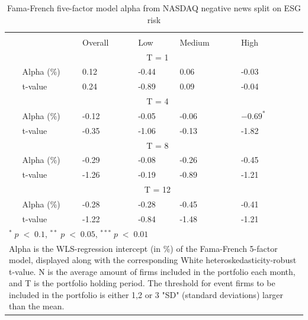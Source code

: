 \setlength{\tabcolsep}{15pt}
\begin{table}[H]
\small
\centering
\caption{Fama-French five-factor model alpha from NASDAQ negative news split on ESG risk} 
\begin{tabular}{llllllc}
\hline \hline \\ 
 &     & Overall &    Low  &  Medium  &  High &  \\    \cline{3-6} 
& &  \multicolumn{3}{c}{ T = 1} & \\ \cline{2-6}
& Alpha (\%)    & 0.12 & -0.44  & 0.06  & -0.03 &  \\ 
& t-value   & 0.24 & -0.89 & 0.09  & -0.04 &  \\
& &  \multicolumn{3}{c}{ T = 4} & \\ \cline{2-6}
& Alpha (\%)   & -0.12 & -0.05  & -0.06  &  $-0.69^{*}$ & \\
& t-value &   -0.35 & -1.06 & -0.13  & -1.82 & \\
& &  \multicolumn{3}{c}{ T = 8} & \\ \cline{2-6}
& Alpha (\%)    & -0.29 & -0.08  & -0.26  & -0.45 &  \\
& t-value &   -1.26 & -0.19  & -0.89 & -1.21 &  \\
& &  \multicolumn{3}{c}{ T = 12} & \\ \cline{2-6}
& Alpha (\%)    & -0.28 & -0.28  & -0.45  & -0.41 &  \\
& t-value &    -1.22 & -0.84  & -1.48 & -1.21 &  \\
\hline \hline
 \multicolumn{7}{l}{ \footnotesize $^* \; p\; <\; 0.1$, $ ^{**} \; p\; <\; 0.05$, $ ^{***} \; p\; <\; 0.01$  } \\
 \multicolumn{7}{p{12cm}}{ \footnotesize Alpha is the WLS-regression intercept (in \%) of the Fama-French 5-factor model, displayed along with the corresponding White heteroskedasticity-robust t-value. N is the average amount of firms included in the portfolio each month, and T is the portfolio holding period. The threshold for event firms to be included in the portfolio is either 1,2 or 3 "SD" (standard deviations) larger than the mean.} \\ 
 \hline
\end{tabular}
\label{tab: FF5_neg_ESG}
\end{table}